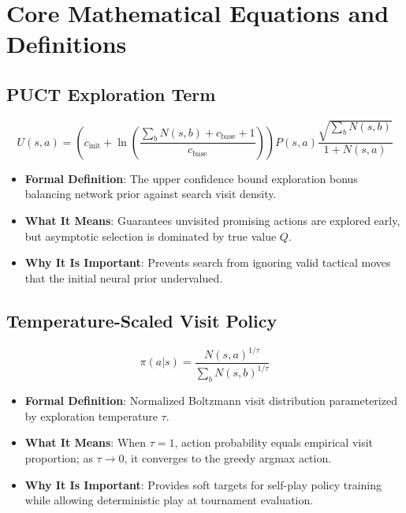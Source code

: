 \documentclass[11pt,a4paper]{article}
\theoremstyle{definition}
\begin{document}
\section{Core Mathematical Equations and Definitions}

\subsection{PUCT Exploration Term}
{\boldmath
\begin{equation}
U(s, a) = \left( c_{\text{init}} + \ln\left( \frac{\sum_b N(s, b) + c_{\text{base}} + 1}{c_{\text{base}}} \right) \right) P(s, a) \frac{\sqrt{\sum_b N(s, b)}}{1 + N(s, a)}
\end{equation}
}
\begin{itemize}
    \item \textbf{Formal Definition}: The upper confidence bound exploration bonus balancing network prior against search visit density.
    \item \textbf{What It Means}: Guarantees unvisited promising actions are explored early, but asymptotic selection is dominated by true value $Q$.
    \item \textbf{Why It Is Important}: Prevents search from ignoring valid tactical moves that the initial neural prior undervalued.
\end{itemize}

\subsection{Temperature-Scaled Visit Policy}
{\boldmath
\begin{equation}
\pi(a | s) = \frac{N(s, a)^{1/\tau}}{\sum_b N(s, b)^{1/\tau}}
\end{equation}
}
\begin{itemize}
    \item \textbf{Formal Definition}: Normalized Boltzmann visit distribution parameterized by exploration temperature $\tau$.
    \item \textbf{What It Means}: When $\tau = 1$, action probability equals empirical visit proportion; as $\tau \to 0$, it converges to the greedy argmax action.
    \item \textbf{Why It Is Important}: Provides soft targets for self-play policy training while allowing deterministic play at tournament evaluation.
\end{itemize}
\end{document}
